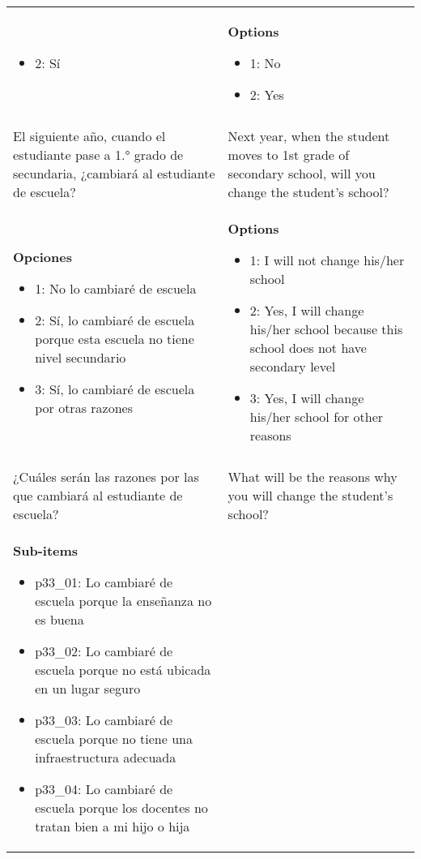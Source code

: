 \documentclass[11pt]{article}
\begin{document}
\begin{longtable}{@{}LL@{}}
\begin{itemize}[leftmargin=*]
\item 2: Sí\end{itemize} & \textbf{Options}\par\begin{itemize}[leftmargin=*]\item 1: No
\item 2: Yes\end{itemize} \\
\addlinespace[4pt]
 \\ 
El siguiente año, cuando el estudiante pase a 1.° grado de secundaria, ¿cambiará al estudiante de escuela? & Next year, when the student moves to 1st grade of secondary school, will you change the student's school? \\
\textbf{Opciones}\par\begin{itemize}[leftmargin=*]\item 1: No lo cambiaré de escuela
\item 2: Sí, lo cambiaré de escuela porque esta escuela no tiene nivel secundario
\item 3: Sí, lo cambiaré de escuela por otras razones\end{itemize} & \textbf{Options}\par\begin{itemize}[leftmargin=*]\item 1: I will not change his/her school
\item 2: Yes, I will change his/her school because this school does not have secondary level
\item 3: Yes, I will change his/her school for other reasons\end{itemize} \\
\addlinespace[4pt]
 \\ 
¿Cuáles serán las razones por las que cambiará al estudiante de escuela? & What will be the reasons why you will change the student's school? \\
\textbf{Sub-items}\par\begin{itemize}[leftmargin=*]\item p33\_01: Lo cambiaré de escuela porque la enseñanza no es buena
\item p33\_02: Lo cambiaré de escuela porque no está ubicada en un lugar seguro
\item p33\_03: Lo cambiaré de escuela porque no tiene una infraestructura adecuada
\item p33\_04: Lo cambiaré de escuela porque los docentes no tratan bien a mi hijo o hija

\end{itemize}
\end{longtable}
\end{document}
